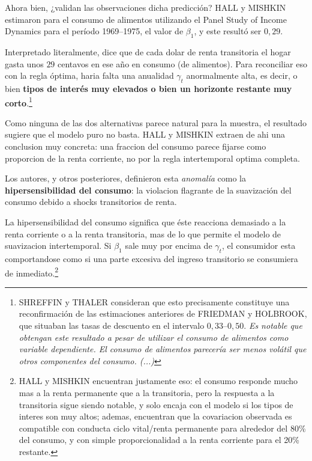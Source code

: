 \documentclass[10pt,a4paper]{article}
\begin{document}
Ahora bien, ¿validan las observaciones dicha predicción? HALL y MISHKIN estimaron para el consumo de alimentos utilizando el Panel Study of Income Dynamics para el período 1969–1975, el valor de $\beta_1$, y este resultó ser $0,29$. 

Interpretado literalmente, dice que de cada dolar de renta transitoria el hogar gasta unos $29$ centavos en ese año en consumo (de alimentos). Para reconciliar eso con la regla óptima, haria falta una anualidad $\gamma_t$ anormalmente alta, es decir, o bien \textbf{tipos de interés muy elevados o bien un horizonte restante muy corto}.\footnote{%
    SHREFFIN y THALER consideran que esto precisamente constituye una reconfirmación de las estimaciones anteriores de FRIEDMAN y HOLBROOK, que situaban las tasas de descuento en el intervalo $0,33–0,50$. \textit{Es notable que obtengan este resultado a pesar de utilizar el consumo de alimentos como variable dependiente. El consumo de alimentos parecería ser menos volátil que otros componentes del consumo. (...)}
} 

Como ninguna de las dos alternativas parece natural para la muestra, el resultado sugiere que el modelo puro no basta. HALL y MISHKIN extraen de ahi una conclusion muy concreta: una fraccion del consumo parece fijarse como proporcion de la renta corriente, no por la regla intertemporal optima completa. 

Los autores, y otros posteriores, definieron esta \textit{anomalía} como la \textbf{hipersensibilidad del consumo}: la violacion flagrante de la suavización del consumo debido a shocks transitorios de renta.

La hipersensibilidad del consumo significa que éste reacciona demasiado a la renta corriente o a la renta transitoria, mas de lo que permite el modelo de suavizacion intertemporal. Si $\beta_1$ sale muy por encima de $\gamma_t$, el consumidor esta comportandose como si una parte excesiva del ingreso transitorio se consumiera de inmediato.\footnote{%
    HALL y MISHKIN encuentran justamente eso: el consumo responde mucho mas a la renta permanente que a la transitoria, pero la respuesta a la transitoria sigue siendo notable, y solo encaja con el modelo si los tipos de interes son muy altos; ademas, encuentran que la covariacion observada es compatible con conducta ciclo vital/renta permanente para alrededor del 80\% del consumo, y con simple proporcionalidad a la renta corriente para el 20\% restante.
}
    
\end{document}
